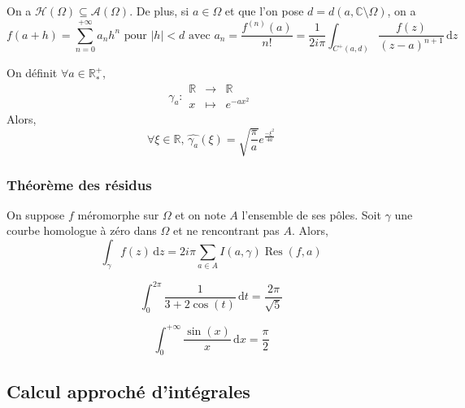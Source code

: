 
	\begin{corollary}
		On a $\mathcal{H}(\Omega) \subseteq \mathcal{A}(\Omega)$. De plus, si $a \in \Omega$ et que l'on pose $d = d(a, \mathbb{C} \setminus \Omega)$, on a
		\[ f(a + h) = \sum_{n=0}^{+\infty} a_n h^n \text{ pour } \vert h \vert < d \text{ avec } a_n = \frac{f^{(n)}(a)}{n!} = \frac{1}{2i\pi} \int_{C^+(a,d)} \frac{f(z)}{(z-a)^{n+1}} \, \mathrm{d}z \]
	\end{corollary}


	\begin{application}
		On définit $\forall a \in \mathbb{R}^+_*$,
		\[ \gamma_a :
		\begin{array}{ccc}
			\mathbb{R} &\rightarrow& \mathbb{R} \\
			x &\mapsto& e^{-ax^2}
		\end{array}
		\]
		Alors,
		\[ \forall \xi \in \mathbb{R}, \, \widehat{\gamma_a}(\xi) = \sqrt{\frac{\pi}{a}} e^{\frac{- \xi^2}{4a}} \]
	\end{application}

	\subsubsection{Théorème des résidus}


	\begin{theorem}
		On suppose $f$ méromorphe sur $\Omega$ et on note $A$ l'ensemble de ses pôles. Soit $\gamma$ une courbe homologue à zéro dans $\Omega$ et ne rencontrant pas $A$. Alors,
		\[ \int_\gamma f(z) \, \mathrm{d}z = 2i\pi \sum_{a \in A} I(a, \gamma) \operatorname{Res}(f, a) \]
	\end{theorem}


	\begin{example}
		\[ \int_{0}^{2\pi} \frac{1}{3 + 2\cos(t)} \, \mathrm{d}t = \frac{2\pi}{\sqrt{5}} \]
	\end{example}

	\begin{example}
		\[ \int_{0}^{+\infty} \frac{\sin(x)}{x} \, \mathrm{d}x = \frac{\pi}{2} \]
	\end{example}

	\subsection{Calcul approché d'intégrales}

